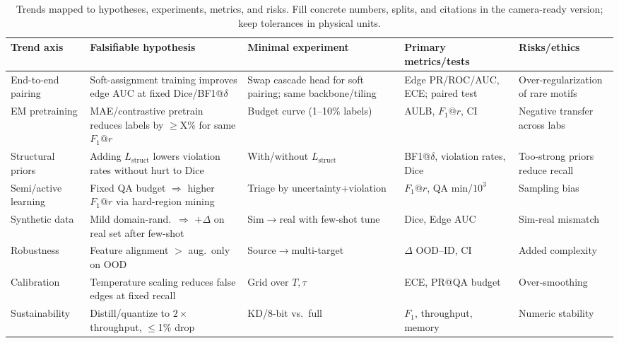 \medskip
\begin{table}[t]
  \centering
  \scriptsize
  \setlength{\tabcolsep}{1.8pt}\renewcommand{\arraystretch}{1.05}
  \begin{tabular}{@{} p{2.9cm} p{5.2cm} p{4.6cm} p{3.0cm} p{2.8cm} @{}}
    \hline
    \textbf{Trend axis} & \textbf{Falsifiable hypothesis} & \textbf{Minimal experiment} & \textbf{Primary metrics/tests} & \textbf{Risks/ethics} \\
    \hline
    End-to-end pairing & Soft-assignment training improves edge AUC at fixed Dice/BF1@\(\delta\) & Swap cascade head for soft pairing; same backbone/tiling & Edge PR/ROC/AUC, ECE; paired test & Over-regularization of rare motifs \\
    EM pretraining & MAE/contrastive pretrain reduces labels by \(\geq\)X\% for same \(F_1@r\) & Budget curve (1--10\% labels) & AULB, \(F_1@r\), CI & Negative transfer across labs \\
    Structural priors & Adding \(L_{\mathrm{struct}}\) lowers violation rates without hurt to Dice & With/without \(L_{\mathrm{struct}}\) & BF1@\(\delta\), violation rates, Dice & Too-strong priors reduce recall \\
    Semi/active learning & Fixed QA budget \(\Rightarrow\) higher \(F_1@r\) via hard-region mining & Triage by uncertainty+violation & \(F_1@r\), QA min/\(10^3\) & Sampling bias \\
    Synthetic data & Mild domain-rand.\ \(\Rightarrow\) \(+\Delta\) on real set after few-shot & Sim\(\to\)real with few-shot tune & Dice, Edge AUC & Sim-real mismatch \\
    Robustness & Feature alignment \(>\) aug.\ only on OOD & Source\(\to\)multi-target & \(\Delta\) OOD--ID, CI & Added complexity \\
    Calibration & Temperature scaling reduces false edges at fixed recall & Grid over \(T,\tau\) & ECE, PR@QA budget & Over-smoothing \\
    Sustainability & Distill/quantize to \(2\times\) throughput, \(\leq\)1\% drop & KD/8-bit vs.\ full & \(F_1\), throughput, memory & Numeric stability \\
    \hline
  \end{tabular}
  \caption{Trends mapped to hypotheses, experiments, metrics, and risks. Fill concrete numbers, splits, and citations in the camera-ready version; keep tolerances in physical units.}
  \label{tab:trends-matrix}
\end{table}

